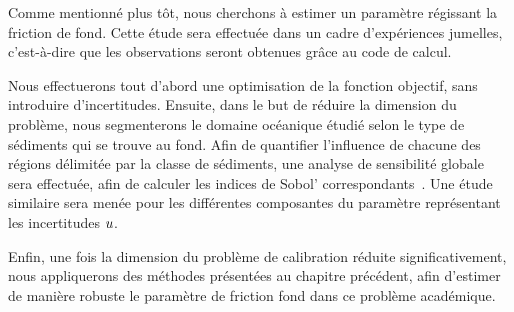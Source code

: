 \documentclass[../../Main_ManuscritThese.tex]{subfiles}
\begin{document}
Comme mentionné plus tôt, nous cherchons à estimer un paramètre
régissant la friction de fond. Cette étude sera effectuée dans un
cadre d'expériences jumelles, c'est-à-dire que les observations seront
obtenues grâce au code de calcul.

Nous effectuerons tout d'abord une optimisation de la fonction
objectif, sans introduire d'incertitudes. Ensuite, dans le but de
réduire la dimension du problème, nous segmenterons le domaine
océanique étudié selon le type de sédiments qui se trouve au
fond. Afin de quantifier l'influence de chacune des régions délimitée
par la classe de sédiments, une analyse de sensibilité globale sera
effectuée, afin de calculer les indices de Sobol'
correspondants~\cite{sobol_global_2001,iooss_revue_2011}. Une étude
similaire sera menée pour les différentes composantes du paramètre
représentant les incertitudes $u$.

Enfin, une fois la dimension du problème de calibration réduite
significativement, nous appliquerons des méthodes présentées au
chapitre précédent, afin d'estimer de manière robuste le paramètre de
friction fond dans ce problème académique.


\etoile
\vfill





\subfileLocal{
	\pagestyle{empty}
	
	
}
\end{document}
